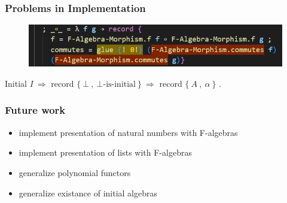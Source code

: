 \documentclass{beamer}
\begin{document}
\begin{frame}
\frametitle{Problems in Implementation}

\pause

\begin{figure}[h]
\includegraphics[width=12cm]{yellow.PNG}
\end{figure}

\pause

Initial $I\ \Rightarrow$ record $\{\ \bot \ ,\ \bot \text{-is-initial}\ \}\ \Rightarrow$ record $\{\ A \ ,\ \alpha \ \}$ .

\end{frame}
\begin{frame}
\frametitle{Future work}
\begin{itemize}
\item implement presentation of natural numbers with F-algebras
\item implement presentation of lists with F-algebras
\item generalize polynomial functors
\item generalize existance of initial algebras
\end{itemize}


\end{frame}




\end{document}
